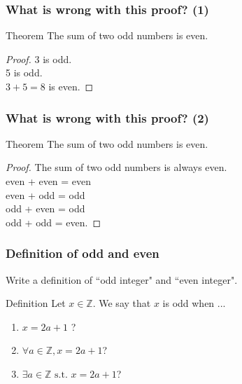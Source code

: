\begin{frame}
	\frametitle{What is wrong with this proof? (1)}

	\begin{block}{Theorem}
		The sum of two odd numbers is even.
	\end{block}

	\vfill

	\begin{proof}
		3 is odd. \\ 5 is odd. \\ $3+5 = 8$ is even.
	\end{proof}

	\vfill
\end{frame}

\begin{frame}
	\frametitle{What is wrong with this proof? (2)}

	\begin{block}{Theorem}
		The sum of two odd numbers is even.
	\end{block}

	\vfill

	\begin{proof}
		The sum of two odd numbers is always even. \\ even + even = even \\ even +
		odd = odd \\ odd + even = odd \\ odd + odd = even.
	\end{proof}

	\vfill
\end{frame}

\begin{frame}
	\frametitle{Definition of odd and even}

	Write a definition of ``odd integer" and ``even integer".

	\vfill

	\begin{block}{Definition}
		Let $x \in \mathbb{Z}$. We say that $x$ is odd when ...
		\begin{enumerate}
			\item $x = 2a+1$ ?

			\item $\displaystyle \forall a \in \mathbb{Z}, x = 2a+ 1$?

			\item $\displaystyle \exists a \in \mathbb{Z}\text{ s.t. }x = 2a+ 1$?
		\end{enumerate}
	\end{block}

	\vfill
\end{frame}

